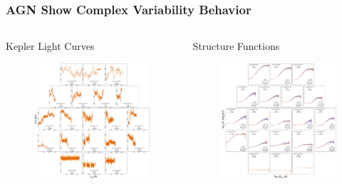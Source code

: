 \documentclass[hyperref={pdfpagelabels=false}]{beamer}
\begin{document}
\begin{frame}
\frametitle{AGN Show Complex Variability Behavior}
  \begin{columns}
    \centering
    \begin{column}{0.35\textwidth}
      \centering
      {\scriptsize Kepler Light Curves}
      \begin{figure}
        \includegraphics[scale=0.32]{images/AllLC.jpg}
      \end{figure}
    \end{column}
    \begin{column}{0.35\textwidth}
      \centering
      {\scriptsize Structure Functions}
      \begin{figure}
        \includegraphics[scale=0.32]{images/AllSF.jpg}

\end{figure}
\end{column}
\end{columns}
\end{frame}
\end{document}
